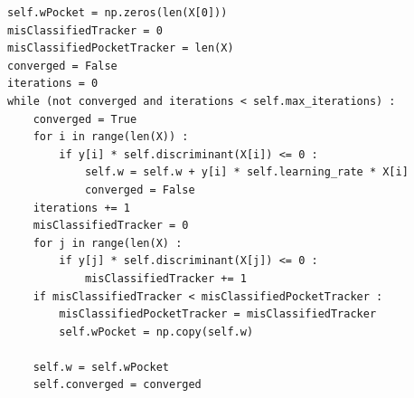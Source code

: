 \documentclass{article}
\begin{document}
\begin{lstlisting}
self.wPocket = np.zeros(len(X[0]))
misClassifiedTracker = 0
misClassifiedPocketTracker = len(X)
converged = False
iterations = 0
while (not converged and iterations < self.max_iterations) :
    converged = True
    for i in range(len(X)) :
        if y[i] * self.discriminant(X[i]) <= 0 :
            self.w = self.w + y[i] * self.learning_rate * X[i]                    
            converged = False
    iterations += 1  
    misClassifiedTracker = 0
    for j in range(len(X) :
        if y[j] * self.discriminant(X[j]) <= 0 :
            misClassifiedTracker += 1
    if misClassifiedTracker < misClassifiedPocketTracker :
        misClassifiedPocketTracker = misClassifiedTracker
        self.wPocket = np.copy(self.w)

    self.w = self.wPocket
    self.converged = converged
\end{lstlisting}
\end{document}

